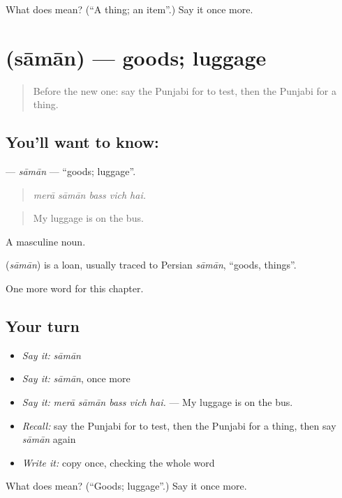 \begin{tcolorbox}[breakable,colback=teal!4,colframe=teal!35!black,title={Before you move on}]
What does  mean? (\textquotedblleft{}A thing; an item\textquotedblright{}.) Say it once more.
\end{tcolorbox}
\section[\texorpdfstring{\pa{ਸਾਮਾਨ} (sāmān)}{ਸਾਮਾਨ (sāmān)}]{ (sāmān) — goods; luggage}

\label{lesson:PA-C277-saman}



\begin{quote}
Before the new one: say the Punjabi for to test, then the Punjabi for a thing.
\end{quote}

\subsection*{You'll want to know: }
\textbf{} — \emph{sāmān} — \textquotedblleft{}goods; luggage\textquotedblright{}.

\begin{quote}
    
\end{quote}

\begin{quote}
\emph{merā sāmān bass vich hai.}
\end{quote}

\begin{quote}
My luggage is on the bus.
\end{quote}

A masculine noun.

\begin{cousinweb}
\textbf{} (\emph{sāmān}) is a loan, usually traced to Persian \emph{sāmān}, \textquotedblleft{}goods, things\textquotedblright{}.
\end{cousinweb}

\begin{grammarlens}[title={What you've built}]
One more word for this chapter.
\end{grammarlens}

\subsection*{Your turn}
\begin{itemize}
\raggedright
  \item \emph{Say it:} \emph{sāmān}
  \item \emph{Say it:} \emph{sāmān}, once more
  \item \emph{Say it:} \emph{merā sāmān bass vich hai.} — My luggage is on the bus.
  \item \emph{Recall:} say the Punjabi for to test, then the Punjabi for a thing, then say \emph{sāmān} again
  \item \emph{Write it:} copy \textbf{} once, checking the whole word
\end{itemize}

\begin{tcolorbox}[breakable,colback=teal!4,colframe=teal!35!black,title={Before you move on}]
What does  mean? (\textquotedblleft{}Goods; luggage\textquotedblright{}.) Say it once more.
\end{tcolorbox}
